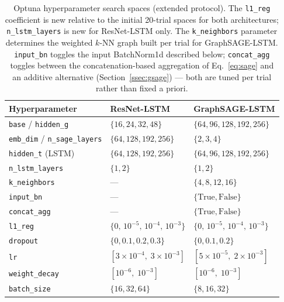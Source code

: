 \begin{table}[t]
  \centering
  \caption{Optuna hyperparameter search spaces (extended protocol). The
           \texttt{l1\_reg} coefficient is new relative to the initial
           20-trial spaces for both architectures; \texttt{n\_lstm\_layers}
           is new for ResNet-LSTM only. The \texttt{k\_neighbors}
           parameter determines the weighted $k$-NN graph built per trial for
           GraphSAGE-LSTM. \texttt{input\_bn} toggles the input BatchNorm1d
           described below; \texttt{concat\_agg} toggles between the
           concatenation-based aggregation of Eq.~\ref{eq:sage} and an additive
           alternative (Section~\ref{ssec:gsage}) --- both are tuned per trial
           rather than fixed a priori.}
  \label{tab:hpspace}
  \setlength{\tabcolsep}{5pt}
  \begin{tabular}{lll}
    \toprule
    \textbf{Hyperparameter} & \textbf{ResNet-LSTM} & \textbf{GraphSAGE-LSTM} \\
    \midrule
    \texttt{base} / \texttt{hidden\_g}           & $\{16,24,32,48\}$                     & $\{64,96,128,192,256\}$               \\
    \texttt{emb\_dim} / \texttt{n\_sage\_layers} & $\{64,128,192,256\}$                  & $\{2,3,4\}$                           \\
    \texttt{hidden\_t} (LSTM)                    & $\{64,128,192,256\}$                  & $\{64,96,128,192,256\}$               \\
    \texttt{n\_lstm\_layers}                     & $\{1,2\}$                             & $\{1,2\}$                             \\
    \texttt{k\_neighbors}                        & ---                                   & $\{4,8,12,16\}$                       \\
    \texttt{input\_bn}                           & ---                                   & $\{\text{True},\text{False}\}$        \\
    \texttt{concat\_agg}                         & ---                                   & $\{\text{True},\text{False}\}$        \\
    \texttt{l1\_reg}                             & $\{0,\,10^{-5},\,10^{-4},\,10^{-3}\}$& $\{0,\,10^{-5},\,10^{-4},\,10^{-3}\}$\\
    \texttt{dropout}                             & $\{0,0.1,0.2,0.3\}$                  & $\{0,0.1,0.2\}$                       \\
    \texttt{lr}                                  & $[3{\times}10^{-4},\;3{\times}10^{-3}]$ & $[5{\times}10^{-5},\;2{\times}10^{-3}]$ \\
    \texttt{weight\_decay}                       & $[10^{-6},\;10^{-3}]$                & $[10^{-6},\;10^{-3}]$                 \\
    \texttt{batch\_size}                         & $\{16,32,64\}$                        & $\{8,16,32\}$                         \\
    \bottomrule
  \end{tabular}
\end{table}

